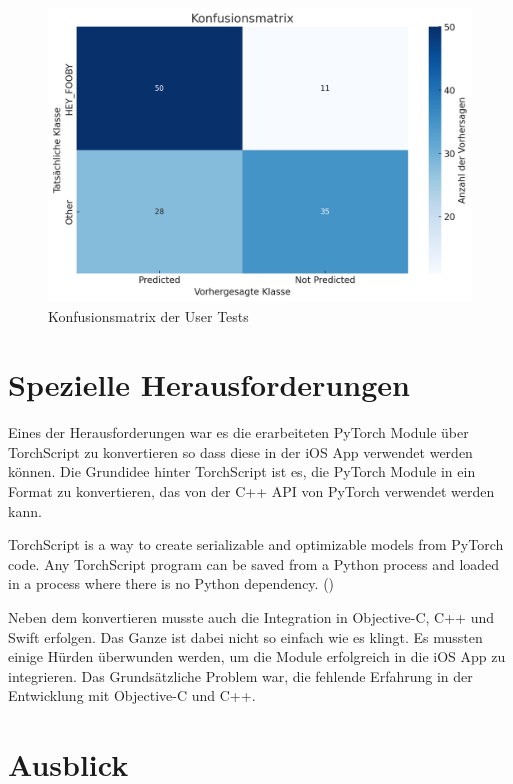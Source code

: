 \documentclass[11pt,a4paper]{article}
\begin{document}
\begin{figure}[H]
\centering
\includegraphics[width=.5\linewidth]{img/eval-usertests.png}
\caption{Konfusionsmatrix der User Tests}
\end{figure}


\section{Spezielle Herausforderungen}
Eines der Herausforderungen war es die erarbeiteten PyTorch Module über TorchScript zu konvertieren so dass diese in der iOS App verwendet werden können. Die Grundidee hinter TorchScript ist es, die PyTorch Module in ein Format zu konvertieren, das von der C++ API von PyTorch verwendet werden kann. 

\begin{displayquote}
TorchScript is a way to create serializable and optimizable models from PyTorch code. Any TorchScript program can be saved from a Python process and loaded in a process where there is no Python dependency. (\cite{pytorch2023jit})
\end{displayquote}

\noindent
Neben dem konvertieren musste auch die Integration in Objective-C, C++ und Swift erfolgen. Das Ganze ist dabei nicht so einfach wie es klingt. Es mussten einige Hürden überwunden werden, um die Module erfolgreich in die iOS App zu integrieren. Das Grundsätzliche Problem war, die fehlende Erfahrung in der Entwicklung mit Objective-C und C++.

\section{Ausblick}
\end{document}
